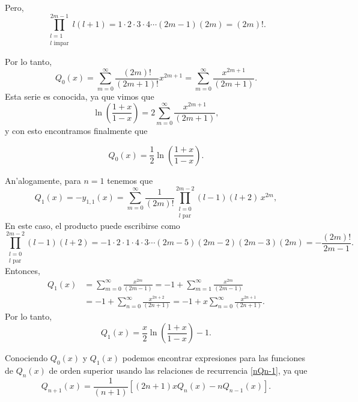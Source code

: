 Pero,
\begin{equation}
\prod_{\substack{l=1 \\ l \text{ impar}}}^{2m-1}l(l+1)=1\cdot 2\cdot 3\cdot 4\cdots (2m-1)(2m)=(2m)!.
\end{equation}

Por lo tanto, 
\begin{equation}
Q_0(x)=\sum_{m=0}^\infty\frac{(2m)!}{(2m+1)!}x^{2m+1} =\sum_{m=0}^\infty\frac{x^{2m+1}}{(2m+1)}.
\end{equation}
Esta serie es conocida, ya que vimos que
\begin{equation}
\ln\left(\frac{1+x}{1-x}\right)=2\sum_{m=0}^\infty\frac{x^{2m+1}}{(2m+1)},
\end{equation}
y con esto encontramos finalmente que

\begin{equation}
\boxed{Q_0(x)=\frac{1}{2}\ln\left(\frac{1+x}{1-x}\right).}
\end{equation}

An'alogamente, para $n=1$ tenemos que
\begin{equation}
Q_1(x)=-y_{1,1}(x)=\sum_{m=0}^\infty\frac{1}{(2m)!}
\prod_{\substack{l=0 \\ l \text{ par}}}^{2m-2}(l-1)(l+2)\,x^{2m},
\end{equation}
En este caso, el producto puede escribirse como
\begin{equation}
\prod_{\substack{l=0 \\ l \text{ par}}}^{2m-2}(l-1)(l+2)=-1\cdot 2\cdot 1\cdot 4\cdot 3\cdots (2m-5)(2m-2)(2m-3)(2m)=-\frac{(2m)!}{2m-1}.
\end{equation}
Entonces,
\begin{align}
Q_1(x) &= \sum_{m=0}^\infty\frac{x^{2m}}{(2m-1)} =-1+\sum_{m=1}^\infty\frac{x^{2m}}{(2m-1)} \\
&= -1+\sum_{n=0}^\infty\frac{x^{2n+2}}{(2n+1)}
=-1+x\sum_{n=0}^\infty\frac{x^{2n+1}}{(2n+1)}.
\end{align}
Por lo tanto,
\begin{equation}
\boxed{Q_1(x)=\frac{x}{2}\ln\left(\frac{1+x}{1-x}\right)-1.}
\end{equation}

Conociendo $Q_0(x)$ y $Q_1(x)$ podemos encontrar expresiones para las funciones de $Q_n(x)$ de orden superior usando las relaciones de recurrencia \eqref{nQn-1}, ya que
\begin{equation}
Q_{n+1}(x)=\frac{1}{(n+1)}\left[(2n+1)xQ_n(x)-nQ_{n-1}(x)\right].
\end{equation} 

